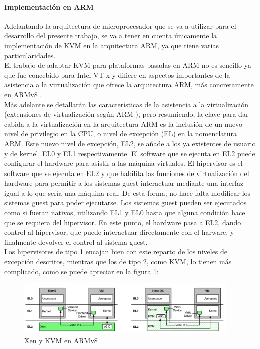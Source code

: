 \paragraph{Implementación en ARM}
Adelantando la arquitectura de microprocesador que se va a utilizar para el desarrollo del presente trabajo, se va a tener en cuenta únicamente la implementación de KVM en la arquitectura ARM, ya que tiene varias particularidades.\\
El trabajo de adaptar KVM para plataformas basadas en ARM no es sencillo ya que fue concebido para Intel VT-x y difiere en aspectos importantes de la asistencia a la virtualización que ofrece la arquitectura ARM, más concretamente en ARMv8 \cite{kvm_1}.\\
Más adelante se detallarán las características de la asistencia a la virtualización (extensiones de virtualización según ARM \cite{armv8_el}), pero resumiendo, la clave para dar cabida a la virtualización en la arquitectura ARM es la inclusión de un nuevo nivel de privilegio en la CPU, o nivel de excepción (EL) en la nomenclatura ARM. Este nuevo nivel de excepción, EL2, se añade a los ya existentes de usuario y de kernel, EL0 y EL1 respectivamente.
El software que se ejecuta en EL2 puede configurar el hardware para asistir a las máquina virtuales. El hipervisor es el software que se ejecuta en EL2 y que habilita las funciones de virtualización del hardware para permitir a los sistemas guest interactuar mediante una interfaz igual a lo que sería una máquina real. De esta forma, no hace falta modificar los sistemas guest para poder ejecutarse. Los sistemas guest pueden ser ejecutados como si fueran nativos, utilizando EL1 y EL0 hasta que alguna condición hace que se requiera del hipervisor. En este punto, el hardware pasa a EL2, dando control al hipervisor, que puede interactuar directamente con el harware, y finalmente devolver el control al sistema guest.\\
Los hipervisores de tipo 1 encajan bien con este reparto de los niveles de excepción descritos, mientras que los de tipo 2, como KVM, lo tienen más complicado, como se puede apreciar en la figura \ref{fig:kvm_and_xen}:

\begin{figure}[!htb]
  \centering
  \includegraphics[width=0.95\textwidth]{recursos/kvm_xen_1.png}
  \caption{Xen y KVM en ARMv8}
  \label{fig:kvm_and_xen}
\end{figure}

